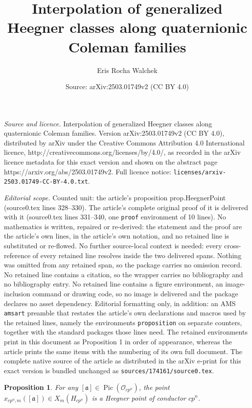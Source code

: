 \documentclass[10pt,a4paper]{amsart}
\title{Interpolation of generalized Heegner classes along quaternionic Coleman families}
\author{Eris Rocha Walchek}
\date{Source: arXiv:2503.01749v2 (CC BY 4.0)}
\newtheorem{proposition}{Proposition}
\DeclareMathOperator{\Pic}{Pic}
\begin{document}
\maketitle

\noindent\emph{Source and licence.} Interpolation of generalized Heegner classes along quaternionic Coleman families. Version arXiv:2503.01749v2 (CC BY 4.0), distributed by arXiv under the Creative Commons Attribution 4.0 International licence, http://creativecommons.org/licenses/by/4.0/, as recorded in the arXiv licence metadata for this exact version and shown on the abstract page https://arxiv.org/abs/2503.01749v2. Full licence notice: \texttt{licenses/arxiv-2503.01749-CC-BY-4.0.txt}.\par\smallskip

\noindent\textit{Editorial scope.} Counted unit: the article's proposition prop.HeegnerPoint (source0.tex lines 328--330). The article's complete original proof of it is delivered with it (source0.tex lines 331--340, one \texttt{proof} environment of 10 lines). No mathematics is written, repaired or re-derived: the statement and the proof are the article's own lines, in the article's own notation, and no retained line is substituted or re-flowed.  No further source-local context is needed: every cross-reference of every retained line resolves inside the two delivered spans.  Nothing was omitted from any retained span, so the package carries no omission record.  No retained line contains a citation, so the wrapper carries no bibliography and no bibliography entry.  No retained line contains a figure environment, an image-inclusion command or drawing code, so no image is delivered and the package declares no asset dependency.  Editorial formatting only, in addition: an AMS \texttt{amsart} preamble that restates the article's own declarations and macros used by the retained lines, namely the environments \texttt{proposition} on separate counters, together with the standard packages those lines need.  The retained environments print in this document as Proposition 1 in order of appearance, whereas the article prints the same items with the numbering of its own full document.  The complete native source of the article as distributed in the arXiv e-print for this exact version is bundled unchanged as \texttt{sources/174161/source0.tex}.
\begin{proposition}\label{prop.HeegnerPoint}
For any $[\mathfrak{a}]\in\Pic(\mathcal{O}_{cp^n})$, the point $x_{cp^n,m}([\mathfrak{a}])\in X_m(H_{cp^n})$ is a Heegner point of conductor $cp^n$.
\end{proposition}
\end{document}
